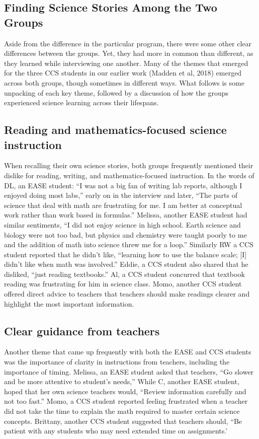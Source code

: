 \documentclass[11pt]{sig-alternate}
\begin{document}
\begin{large}
\section*{Finding Science Stories Among the Two Groups}
Aside from the difference in the particular program, there were some other clear differences between the groups. Yet, they had more in common than different, as they learned while interviewing one another. Many of the themes that emerged for the three CCS students in our earlier work (Madden et al, 2018) emerged across both groups, though sometimes in different ways. What follows is some unpacking of each key theme, followed by a discussion of how the groups experienced science learning across their lifespans. 

\subsection*{Reading and mathematics-focused science instruction}
When recalling their own science stories, both groups frequently mentioned their dislike for reading, writing, and mathematics-focused instruction. In the words of DL, an EASE student: “I was not a big fan of writing lab reports, although I enjoyed doing most labs,” early on in the interview and later, “The parts of science that deal with math are frustrating for me. I am better at conceptual work rather than work based in formulas.” Melissa, another EASE student had similar sentiments, “I did not enjoy science in high school. Earth science and biology were not too bad, but physics and chemistry were taught poorly to me and the addition of math into science threw me for a loop.” Similarly RW a CCS student reported that he didn’t like, “learning how to use the balance scale; [I] didn't like when math was involved.” Eddie, a CCS student also shared that he disliked, “just reading textbooks.” Al, a CCS student concurred that textbook reading was frustrating for him in science class. Momo, another CCS student offered direct advice to teachers that teachers should make readings clearer and highlight the most important information. 

\subsection*{Clear guidance from teachers}
Another theme that came up frequently with both the EASE and CCS students was the importance of clarity in instructions from teachers, including the importance of timing. Melissa, an EASE student asked that teachers, “Go slower and be more attentive to student's needs,” While C, another EASE student, hoped that her own science teachers would, “Review information carefully and not too fast.” Momo, a CCS student reported feeling frustrated when a teacher did not take the time to explain the math required to master certain science concepts. Brittany, another CCS student suggested that teachers should, “Be patient with any students who may need extended time on assignments.’


\end{large}
\end{document}
